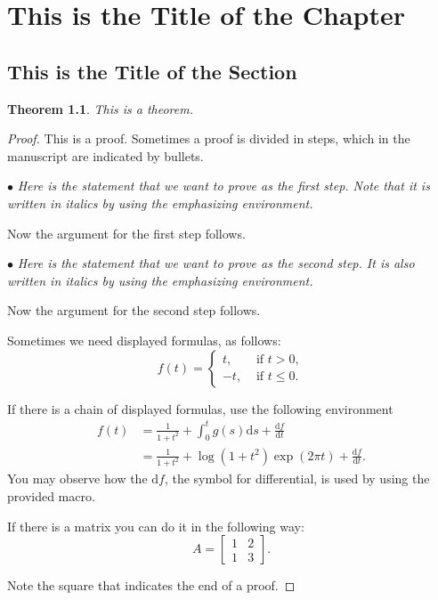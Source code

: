 \documentclass[12pt]{amsbook}
\newtheorem{theorem}{Theorem}[section]
\theoremstyle{definition}
\newcommand{\de}{\mathrm{d}} %
\begin{document}
\chapter{This is the Title of the Chapter}

\section{This is the Title of the Section}


\begin{theorem} This is a theorem.
\end{theorem}

\begin{proof}
This is a proof. Sometimes a proof is divided in steps, which in the
manuscript are indicated by bullets.

$\bullet$ \emph{Here is the statement that we want to prove as the first
  step. Note that it is written in italics by using the emphasizing
  environment.}

Now the argument for the first step follows.

$\bullet$ \emph{Here is the statement that we want to prove as the second
  step. It is also written in italics by using the emphasizing
  environment.}

Now the argument for the second step follows. 

Sometimes we need displayed formulas, as follows:
\begin{equation*}
f(t)=\begin{cases} t, & \mbox{ if }t>0,\\ -t, & \mbox{ if }t\leq 0.
\end{cases}
\end{equation*}

If there is a chain of displayed formulas, use the following environment
\begin{align*}
f(t) & = \frac{1}{1+t^2}+\int_0^t g(s)\de s+ \frac{\de f}{\de t} \\
& = \frac{1}{1+t^2}+ \log(1+t^2)\exp(2\pi t)+ \frac{\de f}{\de t}.
\end{align*}
You may observe how the $\de f$, the symbol for differential, is used by using
the provided macro. 

If there is a matrix you can do it in the following way:
\begin{equation*}
A=\left[\begin{matrix} 1 & 2 \\ 1 & 3 \end{matrix}\right].
\end{equation*}

Note the square that indicates the end of a proof.
\end{proof}
\end{document}
